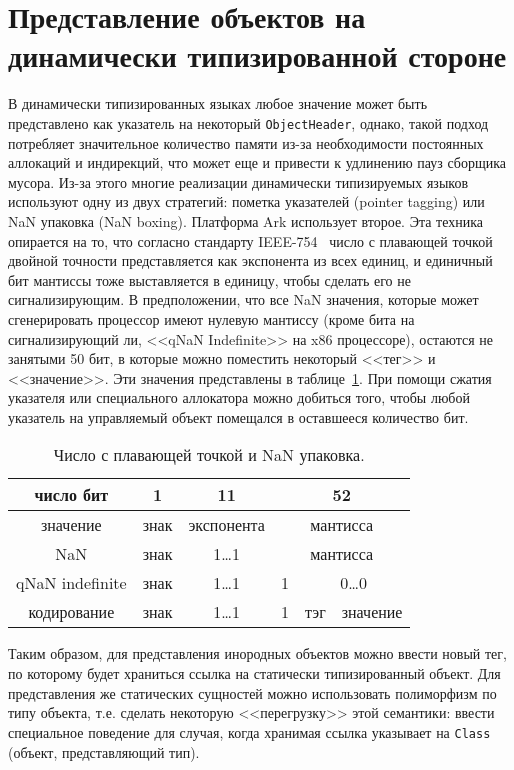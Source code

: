 \documentclass[times
]{itmo-student-thesis}
\begin{document}
\section{Представление объектов на динамически типизированной стороне}\label{nan-boxing-explanation}
В динамически типизированных языках любое значение может быть представлено как указатель на некоторый \texttt{ObjectHeader}, однако, такой подход потребляет значительное количество памяти из-за необходимости постоянных аллокаций и индирекций, что может еще и привести к удлинению пауз сборщика мусора. Из-за этого многие реализации динамически типизируемых языков~\cite{luajit-nan-box,v8-pointer-tagging} используют одну из двух стратегий: пометка указателей (pointer tagging) или NaN упаковка (NaN boxing). Платформа Ark использует второе. Эта техника опирается на то, что согласно стандарту IEEE-754~\cite{cowlishaw2008standard} число с плавающей точкой двойной точности представляется как экспонента из всех единиц, и единичный бит мантиссы тоже выставляется в единицу, чтобы сделать его не сигнализирующим. В предположении, что все NaN значения, которые может сгенерировать процессор имеют нулевую мантиссу (кроме бита на сигнализирующий ли, <<qNaN Indefinite>> на x86 процессоре), остаются не занятыми 50 бит, в которые можно поместить некоторый <<тег>> и <<значение>>. Эти значения представлены в таблице~\ref{fig:nan-explain}. При помощи сжатия указателя или специального аллокатора можно добиться того, чтобы любой указатель на управляемый объект помещался в оставшееся количество бит.\par
\begin{table}[!h]
	\caption{Число с плавающей точкой и NaN упаковка.}\label{fig:nan-explain}
	\centering
	\begin{tabular}{|c|c|c|c|c|c|}
		\hline
		число бит & 1 & 11 & \multicolumn{3}{c|}{52} \\
		\hline
		значение & знак & экспонента & \multicolumn{3}{c|}{мантисса} \\
		\hline
		NaN & знак & 1\dots 1 & \multicolumn{3}{c|}{мантисса} \\
		\hline
		qNaN indefinite & знак & 1\dots 1 & 1 & \multicolumn{2}{c|}{0\dots0} \\
		\hline
		кодирование & знак & 1\dots 1 & 1 & тэг & значение \\
		\hline
	\end{tabular}
\end{table}
Таким образом, для представления инородных объектов можно ввести новый тег, по которому будет храниться ссылка на статически типизированный объект. Для представления же статических сущностей можно использовать полиморфизм по типу объекта, т.е. сделать некоторую <<перегрузку>> этой семантики: ввести специальное поведение для случая, когда хранимая ссылка указывает на \texttt{Class} (объект, представляющий тип).
\end{document}
